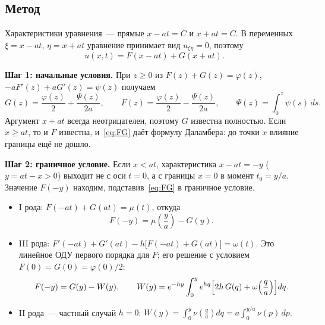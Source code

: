 \documentclass[a4paper,12pt]{article}
\begin{document}
\subsection{Метод}

Характеристики уравнения~--- прямые $x-at=C$ и $x+at=C$. В переменных
$\xi=x-at$, $\eta=x+at$ уравнение принимает вид $u_{\xi\eta}=0$, поэтому
\begin{equation}\label{eq:FG}
  u(x,t)=F(x-at)+G(x+at).
\end{equation}

\textbf{Шаг 1: начальные условия.} При $z\ge 0$ из $F(z)+G(z)=\varphi(z)$,
$-aF'(z)+aG'(z)=\psi(z)$ получаем
\begin{equation}\label{eq:FGinit}
  G(z)=\frac{\varphi(z)}{2}+\frac{\Psi(z)}{2a},\qquad
  F(z)=\frac{\varphi(z)}{2}-\frac{\Psi(z)}{2a},\qquad
  \Psi(z)=\int_{0}^{z}\psi(s)\,ds .
\end{equation}
Аргумент $x+at$ всегда неотрицателен, поэтому $G$ известна полностью.
Если $x\ge at$, то и $F$ известна, и~\eqref{eq:FG} даёт формулу Даламбера:
до точки $x$ влияние границы ещё не дошло.

\textbf{Шаг 2: граничное условие.} Если $x<at$, характеристика $x-at=-y$
($y=at-x>0$) выходит не с оси $t=0$, а с границы $x=0$ в момент $t_0=y/a$.
Значение $F(-y)$ находим, подставив~\eqref{eq:FG} в граничное условие.
\begin{itemize}
  \item I рода: $F(-at)+G(at)=\mu(t)$, откуда
        \begin{equation}\label{eq:F1}
          F(-y)=\mu\!\left(\frac{y}{a}\right)-G(y).
        \end{equation}
  \item III рода: $F'(-at)+G'(at)-h\bigl[F(-at)+G(at)\bigr]=\omega(t)$.
        Это линейное ОДУ первого порядка для $F$; его решение с условием
        $F(0)=G(0)=\varphi(0)/2$:
        \begin{equation}\label{eq:F3}
          F(-y)=G(y)-W(y),\qquad
          W(y)=e^{-hy}\int_{0}^{y}e^{hq}\Bigl[2h\,G(q)+\omega\!\left(\frac{q}{a}\right)\Bigr]dq .
        \end{equation}
  \item II рода~--- частный случай $h=0$:
        $W(y)=\displaystyle\int_{0}^{y}\nu\!\left(\frac{q}{a}\right)dq
        =a\int_{0}^{y/a}\nu(p)\,dp$.
\end{itemize}
\end{document}
